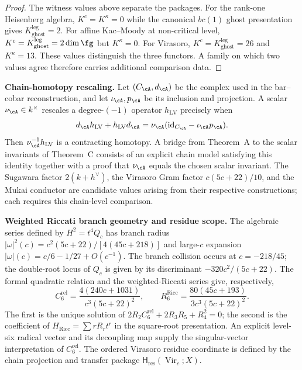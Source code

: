\begin{proof}
The witness values above separate the packages.  For the rank-one
Heisenberg algebra, \(K^c=K^\kappa=0\) while the canonical \(bc(1)\)
ghost presentation gives \(K_{\mathrm{ghost}}^{\mathrm{leg}}=2\).
For affine Kac--Moody at non-critical level,
\(K^c=K_{\mathrm{ghost}}^{\mathrm{leg}}=2\dim\fg\) but
\(K^\kappa=0\).  For Virasoro,
\(K^c=K_{\mathrm{ghost}}^{\mathrm{leg}}=26\) and \(K^\kappa=13\).
These values distinguish the three functors.  A family on which two
values agree therefore carries additional comparison data.
\end{proof}

\smallskip\noindent\textbf{Chain-homotopy rescaling.}
Let $(C_\cA,d_\cA)$ be the complex used in the bar--cobar
reconstruction, and let $\iota_\cA,p_\cA$ be its inclusion and
projection.  A scalar $\nu_\cA\in k^\times$ rescales a degree-$(-1)$
operator $h_{\mathrm{LV}}$ precisely when
\[
d_\cA h_{\mathrm{LV}}+h_{\mathrm{LV}}d_\cA
=\nu_\cA(\mathrm{id}_{C_\cA}-\iota_\cA p_\cA).
\]
Then $\nu_\cA^{-1}h_{\mathrm{LV}}$ is a contracting homotopy.  A bridge
from Theorem~A to the scalar invariants of Theorem~C consists of an
explicit chain model satisfying this identity together with a proof
that $\nu_\cA$ equals the chosen scalar invariant.  The Sugawara factor
$2(k+h^\vee)$, the Virasoro Gram factor $c(5c+22)/10$, and the Mukai
conductor are candidate values arising from their respective
constructions; each requires this chain-level comparison.

\smallskip\noindent\textbf{Weighted Riccati branch geometry and
residue scope.}  The algebraic series defined by $H^2=t^4Q_c$ has
branch radius
$|\omega|^2(c)=c^2(5c+22)/[4(45c+218)]$ and large-$c$ expansion
$|\omega|(c)=c/6-1/27+O(c^{-1})$.  The branch collision occurs at
$c=-218/45$; the double-root locus of $Q_c$ is given by its
discriminant $-320c^2/(5c+22)$.
The formal quadratic relation and the weighted-Riccati series give,
respectively,
\[
 C_6^{\mathrm{rel}}
 =\frac{4(240c+1031)}{c^3(5c+22)^2},
 \qquad
 R_6^{\mathrm{Ricc}}
 =\frac{80(45c+193)}{3c^3(5c+22)^2}.
\]
The first is the unique solution of
$2R_2C_6^{\mathrm{rel}}+2R_3R_5+R_4^2=0$; the second is the coefficient
of $H_{\mathrm{Ricc}}=\sum rR_rt^r$ in the square-root presentation.
An explicit level-six radical vector and its decoupling map supply the
singular-vector interpretation of $C_6^{\mathrm{rel}}$.  The ordered
Virasoro residue coordinate is defined by the chain projection and
transfer package
$\mathsf H_{\mathrm{res}}(\operatorname{Vir}_c;X)$.

